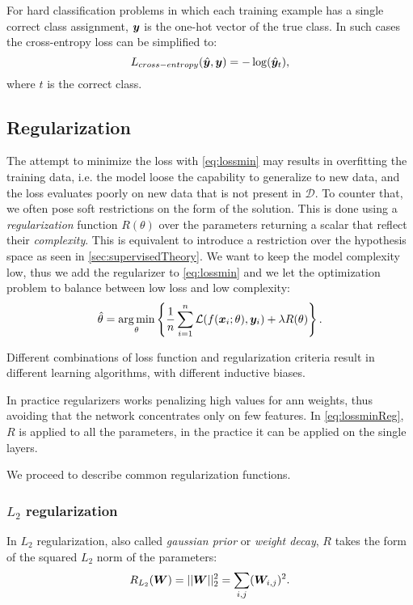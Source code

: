For hard classification problems in which each training example has a
single correct class assignment, $\bm{y}$ is the one-hot vector of
the true class. In such cases the cross-entropy loss can be simplified
to:
\begin{equation*}
  L_{cross-entropy}(\hat{\bm{y}},\bm{y}) = -\log(\hat{\bm{y}}_t),
\end{equation*}
where $t$ is the correct class.

\subsection{Regularization}
The attempt to minimize the loss with \eqref{eq:lossmin} may results 
in overfitting the training data, i.e. the model loose the capability
to generalize to new data, and the loss evaluates poorly on new data
that is not present in $\mathcal{D}$. To counter that, we often pose
soft restrictions on the form of the solution. This is done using a
\emph{regularization}
function $R(\theta)$ over the parameters returning a scalar that
reflect their \emph{complexity}. This is equivalent to introduce a
restriction over the hypothesis space as seen in
\cref{sec:supervisedTheory}. We want to keep the model complexity low,
thus we add the regularizer to \eqref{eq:lossmin} and we let the
optimization problem to balance between low loss and low complexity:
\begin{equation}\label{eq:lossminReg}
  \hat\theta=\operatorname*{arg\,min}_\theta\left\{\frac{1}{n}\sum_{i=1}^n\mathcal{L}(f(\bm{x}_i;\theta),\bm{y}_i)+\lambda
    R(\theta)\right\}.
\end{equation}

Different combinations of loss function and regularization criteria
result in different learning algorithms, with different inductive
biases.

In practice regularizers works penalizing high values for \ac{ann}
weights, thus avoiding that the network concentrates only on few
features. In \eqref{eq:lossminReg}, $R$ is applied to all the
parameters, in the practice it can be applied on the single layers.

We proceed to describe common regularization functions.

\subsubsection{$L_2$ regularization}
In $L_2$ regularization, also called \emph{gaussian prior} or
\emph{weight decay}, $R$ takes the form of the squared $L_2$ norm
of the parameters:
\begin{equation*}
  R_{L_2}(\bm{W})=||\bm{W}||_2^2=\sum_{i,j}(\bm{W}_{i,j})^2.
\end{equation*}

